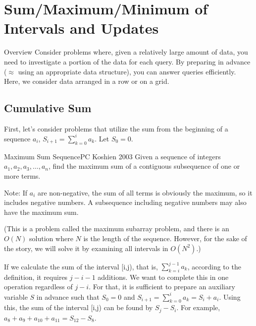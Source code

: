  \chapter{Sum/Maximum/Minimum of Intervals and Updates}

\begin{versionbeta}

\begin{itembox}[l]{Overview}
  Consider problems where, given a relatively large amount of data, you need to investigate a portion of the data for each query. By preparing in advance ($\approx$ using an appropriate data structure), you can answer queries efficiently. Here, we consider data arranged in a row or on a grid.
\end{itembox}
\end{versionbeta}
\section{Cumulative Sum}

First, let's consider problems that utilize the sum from the beginning of a sequence $a_i$, $S_{i+1} = \sum_{k=0}^i a_k$. Let $S_0=0$.

\begin{psbox}{Maximum Sum Sequence}{PC Koshien 2003}
Given a sequence of integers $a_1, a_2, a_3, \ldots, a_n$, find the maximum sum of a contiguous subsequence of one or more terms.

Note: If $a_i$ are non-negative, the sum of all terms is obviously the maximum, so it includes negative numbers. A subsequence including negative numbers may also have the maximum sum.

\end{psbox}

(This is a problem called the maximum subarray problem, and there is an $O(N)$ solution where $N$ is the length of the sequence. However, for the sake of the story, we will solve it by examining all intervals in $O(N^2)$.)

If we calculate the sum of the interval [i,j), that is, $\sum_{k=i}^{j-1} a_k$, according to the definition, it requires $j-i-1$ additions. We want to complete this in one operation regardless of $j-i$.
For that, it is sufficient to prepare an auxiliary variable $S$ in advance such that $S_0=0$ and $S_{i+1} = \sum_{k=0}^i a_k = S_i+a_i$. Using this, the sum of the interval [i,j) can be found by $S_j-S_i$. For example, $a_8+a_9+a_{10}+a_{11} = S_{12} - S_8$.

